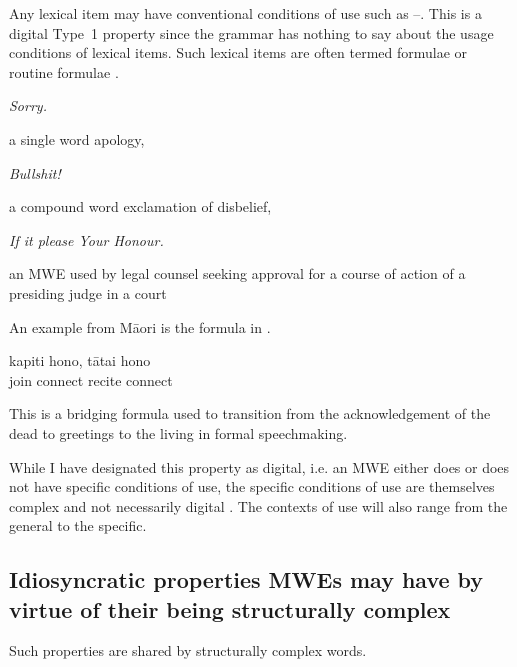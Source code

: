 \documentclass[output=paper]{langsci/langscibook}
\begin{document}
Any lexical item may have conventional conditions of use such as --. This is a digital Type~1 property since the grammar has nothing to say about the usage conditions of lexical items. Such lexical items are often termed formulae or routine formulae  \citep{Coulmas1979}.

\begin{exe}
\ex\label{ex:ex09} \textit{Sorry.}
\end{exe}

\noindent
a single word apology,

\begin{exe}
\ex\label{ex:ex10} \textit{Bullshit!}
\end{exe}

\noindent
a compound word exclamation of disbelief,

\begin{exe}
\ex\label{ex:ex11} \textit{If it please Your Honour.}
\end{exe}

\noindent
an MWE used by legal counsel seeking approval for a course of action of a presiding judge in a court

An example from M\=aori is the formula in . 


\begin{exe}
\ex\label{ex:ex12} 
\gll kapiti hono,       t\=atai   hono\\
join   connect  recite connect\\
\end{exe}

\noindent
This is a bridging formula used to transition from the acknowledgement of the dead to greetings to the living in formal speechmaking.

While %
I have designated this property as digital, i.e. an MWE either does or does not have specific 
conditions of use, the specific conditions of use are themselves complex and not necessarily 
digital \citep{Biber1994}. The contexts of use will also range from the general to the specific. 

\subsection{Idiosyncratic properties MWEs may have by virtue of their being structurally complex}

Such properties are shared by structurally complex words.
\end{document}
